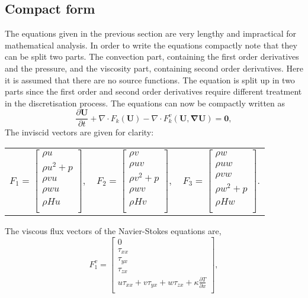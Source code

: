 \documentclass{report}
\newcommand{\dt}[1]{\frac{\partial #1}{\partial t}}
\newcommand{\dx}[1]{\frac{\partial #1}{\partial x}}
\begin{document}
\subsection{Compact form}
The equations given in the previous section are very lengthy and impractical for mathematical analysis. In order to write the equations compactly note that they can be split two parts. The convection part, containing the first order derivatives and the pressure, and the viscosity part, containing second order derivatives. Here it is assumed that there are no source functions. The equation is split up in two parts since the first order and second order derivatives require different treatment in the discretisation process. The equations can now be compactly written as
\begin{equation}
\label{e:NavierStokesCompact}
\dt{\mathbf{U}} + \nabla \cdot {F}_k(\mathbf{U}) - \nabla \cdot {F}_k^v(\mathbf{U},\mathbf{\nabla U}) = \mathbf{0},
\end{equation}
The inviscid vectors are given for clarity:

\begin{center}
\begin{tabular}{ccc}
$
{F}_{1} =
\left[
\begin{array}{c}
\rho u		\\
\rho u^2 + p	 	\\
\rho vu		\\
\rho wu		\\
\rho H u 	\\
\end{array}
\right],$ & 
$
{F}_{2} =
\left[
\begin{array}{c}
\rho v		\\
\rho uv	 	\\
\rho v^2	+ p	\\
\rho wv		\\
\rho H v	\\
\end{array}
\right],$ & 
$
{F}_{3} =
\left[
\begin{array}{c}
\rho w		\\
\rho uw	 	\\
\rho vw		\\
\rho w^2	+ p	\\
\rho H w	\\
\end{array}
\right].$
\end{tabular}
\end{center}
The viscous flux vectors of the Navier-Stokes equations are,
\begin{equation*}
{F}_{1}^v =
\left[
\begin{array}{c}
0		\\
\tau_{xx}	 	\\
\tau_{yx}		\\
\tau_{zx}		\\
u\tau_{xx} + v\tau_{yx} + w\tau_{zx} + \kappa\dx{T}	\\
\end{array}
\right],
\end{equation*}
\end{document}
